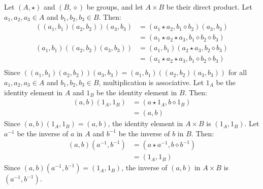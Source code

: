 \documentclass{article}
\begin{document}
\problem
{}
Let $\left(A,\star\right)$ and $\left(B, \diamond\right)$ be groups, and let $A\times B$ be their direct product. Let $a_1, a_2, a_3 \in A$ and $b_1, b_2, b_3 \in B$. Then:
\begin{equation}
    \begin{split}
        \left(\left(a_1,b_1\right)\left(a_2,b_2\right)\right)\left(a_3,b_3\right) & = \left(a_1 \star a_2, b_1 \diamond b_2\right)\left(a_3,b_3\right) \\
        & = \left(a_1 \star a_2  \star a_3, b_1 \diamond b_2 \diamond b_3\right) \\
        \left(a_1,b_1\right)\left(\left(a_2,b_2\right)\left(a_3,b_3\right)\right) & = \left(a_1, b_1\right)\left(a_2 \star a_3, b_2 \diamond b_3\right) \\
        & = \left(a_1 \star a_2  \star a_3, b_1 \diamond b_2 \diamond b_3\right) \\
    \end{split}
\end{equation}
Since $\left(\left(a_1,b_1\right)\left(a_2,b_2\right)\right)\left(a_3,b_3\right) = \left(a_1,b_1\right)\left(\left(a_2,b_2\right)\left(a_3,b_3\right)\right)$ for all $a_1, a_2, a_3 \in A$ and $b_1, b_2, b_3 \in B$, multiplication is associative.
Let $1_A$ be the identity element in $A$ and $1_B$ be the identity element in $B$. Then:
\begin{equation}
    \begin{split}
        \left(a,b\right)\left(1_A,1_B\right) & = \left(a \star 1_A, b \diamond 1_B\right) \\
        & = \left(a, b\right)
    \end{split}
\end{equation}
Since $\left(a,b\right)\left(1_A,1_B\right) = \left(a, b\right)$, the identity element in $A \times B$ is $\left(1_A, 1_B\right)$. 
Let $a^{-1}$ be the inverse of $a$ in $A$ and $b^{-1}$ be the inverse of $b$ in $B$. Then:
\begin{equation}
    \begin{split}
        \left(a,b\right)\left(a^{-1},b^{-1}\right) & = \left(a \star a^{-1}, b \diamond b^{-1}\right) \\
        & = \left(1_A, 1_B\right)
    \end{split}
\end{equation}
Since $\left(a,b\right)\left(a^{-1},b^{-1}\right) = \left(1_A, 1_B\right)$, the inverse of $\left(a, b\right)$ in $A \times B$ is $\left(a^{-1}, b^{-1}\right)$. 
\end{document}
